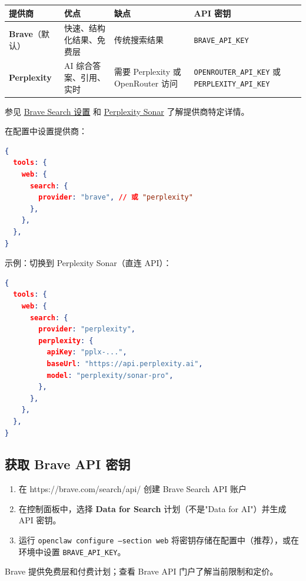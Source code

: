\begin{table}[h]
\centering
\small
\begin{tabular}{|l|l|l|l|}
\hline
提供商 & 优点 & 缺点 & API 密钥 \\
\hline
\textbf{Brave}（默认） & 快速、结构化结果、免费层 & 传统搜索结果 & \texttt{BRAVE\_API\_KEY} \\
\hline
\textbf{Perplexity} & AI 综合答案、引用、实时 & 需要 Perplexity 或 OpenRouter 访问 & \texttt{OPENROUTER\_API\_KEY} 或 \texttt{PERPLEXITY\_API\_KEY} \\
\hline
\end{tabular}
\end{table}



参见 \href{/brave-search}{Brave Search 设置} 和 \href{/perplexity}{Perplexity Sonar} 了解提供商特定详情。

在配置中设置提供商：

\begin{lstlisting}[language=json]
{
  tools: {
    web: {
      search: {
        provider: "brave", // 或 "perplexity"
      },
    },
  },
}
\end{lstlisting}


示例：切换到 Perplexity Sonar（直连 API）：

\begin{lstlisting}[language=json]
{
  tools: {
    web: {
      search: {
        provider: "perplexity",
        perplexity: {
          apiKey: "pplx-...",
          baseUrl: "https://api.perplexity.ai",
          model: "perplexity/sonar-pro",
        },
      },
    },
  },
}
\end{lstlisting}


\subsection{获取 Brave API 密钥}


\begin{enumerate}
  \item 在 https://brave.com/search/api/ 创建 Brave Search API 账户
  \item 在控制面板中，选择 \textbf{Data for Search} 计划（不是"Data for AI"）并生成 API 密钥。
  \item 运行 \texttt{openclaw configure --section web} 将密钥存储在配置中（推荐），或在环境中设置 \texttt{BRAVE\_API\_KEY}。
\end{enumerate}


Brave 提供免费层和付费计划；查看 Brave API 门户了解当前限制和定价。

